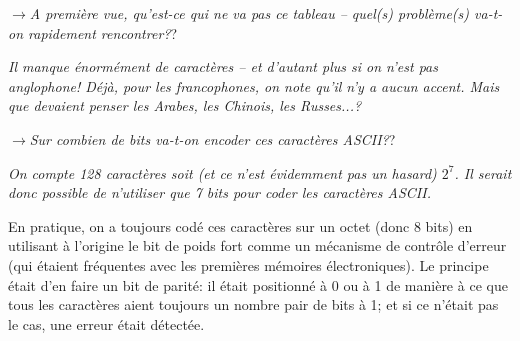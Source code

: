 \documentclass[12pt]{article}
\newcommand{\MaQuestion}[1]{\par\vspace{0.3\baselineskip}\noindent$\rightarrow$\textit{#1}?\par\vspace{0.3\baselineskip}}
\newenvironment{MaReponse}
		{\begin{greyedtextbox}\itshape} %
		{\end{greyedtextbox}}            %
\begin{document}
	\MaQuestion{A première vue, qu'est-ce qui ne va pas ce tableau -- quel(s) problème(s) va-t-on rapidement rencontrer?}
\begin{MaReponse}
	Il manque énormément de caractères -- et d'autant plus si on n'est pas anglophone! Déjà, pour les francophones, on note qu'il n'y a aucun accent. Mais que devaient penser les Arabes, les Chinois, les Russes...?
\end{MaReponse}

	\MaQuestion{Sur combien de bits va-t-on encoder ces caractères ASCII?}
\begin{MaReponse}
	On compte 128 caractères soit (et ce n'est évidemment pas un hasard) $2^7$. Il serait donc possible de n'utiliser que 7 bits pour coder les caractères ASCII.
	
	En pratique, on a toujours codé ces caractères sur un octet (donc 8 bits) en utilisant à l'origine le bit de poids fort comme un mécanisme de contrôle d'erreur (qui étaient fréquentes avec les premières mémoires électroniques). Le principe était d'en faire un bit de parité: il était positionné à 0 ou à 1 de manière à ce que tous les caractères aient toujours un nombre pair de bits à 1; et si ce n'était pas le cas, une erreur était détectée.
\end{MaReponse}
	
\end{document}
